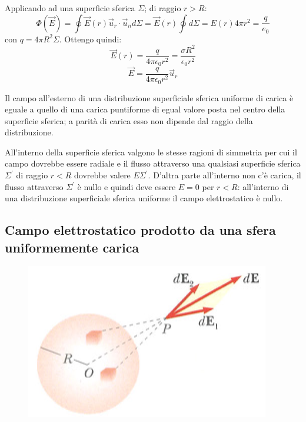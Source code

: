 \documentclass[class=book, crop=false, oneside, 12pt]{standalone}
\begin{document}
Applicando ad una superficie sferica \(\Sigma\); di raggio \(r > R\):
\begin{equation*}
    \Phi (\overrightarrow{E}) = \oint \overrightarrow{E}(r) \overrightarrow{u}_r \cdot \overrightarrow{u}_n d \Sigma = \overrightarrow{E}(r) \oint d \Sigma = E(r) 4 \pi r^2 = \frac{q}{e_0}
\end{equation*}
con \(q = 4 \pi R^2 \Sigma\). Ottengo quindi:
\begin{equation*}
    \overrightarrow{E}(r) = \frac{q}{4 \pi \epsilon_0 r^2} = \frac{\sigma R^2}{\epsilon_0 r^2}
\end{equation*}
\begin{equation*}
    \overrightarrow{E} = \frac{q}{4 \pi \epsilon_0 r^2} \overrightarrow{u}_r
\end{equation*}

Il campo all'esterno di una distribuzione superficiale sferica uniforme di carica è eguale a quello di una carica puntiforme di egual valore posta nel centro della superficie sferica; a parità di carica esso non dipende dal raggio della distribuzione.

All'interno della superficie sferica valgono le stesse ragioni di simmetria per cui il campo dovrebbe essere radiale e il flusso attraverso una qualsiasi superficie sferica \(\Sigma^{\prime}\) di raggio \(r < R\) dovrebbe valere \(E \Sigma^{\prime}\).
D'altra parte all'interno non c'è carica, il flusso attraverso \(\Sigma^{\prime}\) è nullo e quindi deve essere \(E = 0\) per \(r < R\): all'interno di una distribuzione superficiale sferica uniforme il campo elettrostatico è nullo.

\subsection{Campo elettrostatico prodotto da una sfera uniformemente carica}

\begin{figure}[h]
    \includegraphics[scale=0.4]{sfera_carica_piena.png}
    \centering
    \caption{}
\end{figure}
\end{document}
